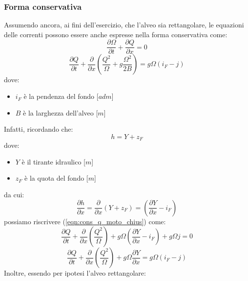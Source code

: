 \documentclass[12pt]{article} %
\begin{document}
\subsubsection{Forma conservativa}
\noindent Assumendo ancora, ai fini dell'esercizio, che l'alveo sia rettangolare, le equazioni delle correnti possono essere anche espresse nella forma conservativa come:
\begin{equation}
    \frac{\partial \Omega }{\partial t}+\frac{\partial Q}{\partial x}=0
    \label{eqn:cons_massa_cons}
\end{equation}
\begin{equation}
    \frac{\partial Q }{\partial t}+\frac{\partial}{\partial x}\left(\frac{Q^2}{\Omega}+g\frac{\Omega^2}{2B}\right)={g\Omega\left(i_F-j\right)}
    \label{eqn:cons_q_moto_cons}
\end{equation}
\noindent dove:
\begin{itemize}
    \item $i_F$ è la pendenza del fondo [$adm$]
    \item $B$ è la larghezza dell'alveo [$m$]
\end{itemize}
\noindent Infatti, ricordando che:
\begin{equation}
    h=Y+z_F
    \label{eqn:h}
\end{equation}
\noindent dove:
\begin{itemize}
    \item $Y$ è il tirante idraulico [$m$]
    \item $z_F$ è la quota del fondo [$m$]
\end{itemize}
\noindent da cui:
\begin{equation}
    \frac{\partial h}{\partial x}=\frac{\partial }{\partial x}\left(Y+z_F\right)=\left(\frac{\partial Y}{\partial x}-i_F\right)
    \label{eqn:dh/dx}
\end{equation}
\noindent possiamo riscrivere (\ref{eqn:cons_q_moto_chius}) come:
\begin{equation*}
    \frac{\partial Q }{\partial t}+\frac{\partial}{\partial x}\left(\frac{Q^2}{\Omega}\right)+g\Omega\left(\frac{\partial Y}{\partial x}-i_F\right)+{g\Omega j}=0
\end{equation*}
\begin{equation}
    \frac{\partial Q }{\partial t}+\frac{\partial}{\partial x}\left(\frac{Q^2}{\Omega}\right)+g\Omega\frac{\partial Y}{\partial x}=g\Omega\left(i_F-j\right)
       \label{eqn:cons_q_moto_iF}
\end{equation}
\noindent Inoltre, essendo per ipotesi l'alveo rettangolare:
\end{document}

